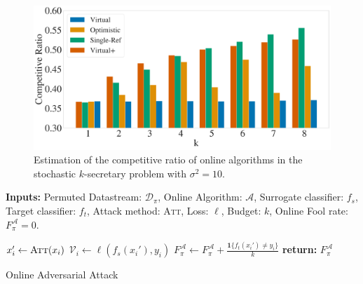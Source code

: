 \begin{minipage}[t]{.48\textwidth}
\begin{figure}[H]
     \vspace{-15pt}
    \includegraphics[width=1.01\linewidth]{Figures/Competitive_Ratio3Bar8-Var-10.pdf}
    \vspace{-15pt}
    \caption{Estimation of the competitive ratio of online algorithms in the stochastic $k$-secretary problem with $\sigma^2=10$.}
    \label{fig:synthetic_data}
\end{figure}
\end{minipage}
\hfill
\begin{minipage}[t]{.48\textwidth}
\vspace{-15pt}  
    \begin{algorithm}[H]
    \small
    \textbf{Inputs:} Permuted Datastream: $\mathcal{D}_\pi$, Online Algorithm: $\mathcal{A}$,  Surrogate classifier: $f_s$, Target classifier: $f_t$,  Attack method: \textsc{Att}, Loss: $\ell$,  Budget: $k$,  
    Online Fool rate: $F^{\mathcal{A}}_\pi=0$.
    \begin{algorithmic}[1]
    \STATE $x_i' \leftarrow  \textsc{Att}(x_i)$ \hfill {}
    \STATE $\mathcal{V}_i \leftarrow \ell(f_s(x_i'),y_i)$  \hfill {}
    \STATE  $F^{\mathcal{A}}_\pi \leftarrow F^{\mathcal{A}}_\pi+\tfrac{\mathbf{1}\{f_t(x_i')\neq y_i\}}{k}$  \hfill{} 
    \ENDIF
    \ENDFOR
    \STATE \textbf{return:} $F^{\mathcal{A}}_\pi$ \hfill{} 
    \end{algorithmic}
     \caption{\small Online Adversarial Attack}
     \label{alg:online_adv_attack}
    \end{algorithm}
\end{minipage}


